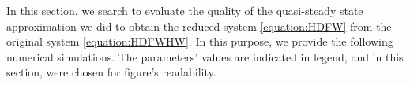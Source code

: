 \documentclass{article}
\begin{document}
In this section, we search to evaluate the quality of the quasi-steady state approximation we did to obtain the reduced system \eqref{equation:HDFW} from the original system \eqref{equation:HDFWHW}. In this purpose, we provide the following numerical simulations. The parameters' values are indicated in legend, and in this section, were chosen for figure's readability.

\end{document}
